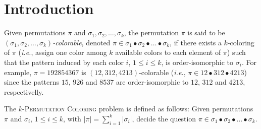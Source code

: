 \section{Introduction}
\label{section:Introduction}

Given permutations $\pi$ and $\sigma_1, \sigma_2, \ldots, \sigma_k$,
the permutation $\pi$ is said to be
\emph{$(\sigma_1, \sigma_2, \ldots, \sigma_k)$-colorable},
denoted $\pi \in \sigma_1 \bullet \sigma_2 \bullet \dots \bullet \sigma_k$,
if there exists a $k$-coloring of $\pi$ (\emph{i.e.}, assign one color
among $k$ available colors to each element of $\pi$) such that the
pattern induced by each color $i$, $1 \leq i \leq k$, is order-isomorphic
to $\sigma_i$.
For example, $\pi = 192854367$ is $(12, 312, 4213)$-colorable
(\emph{i.e.}, $\pi \in 12 \bullet 312 \bullet 4213$) since
the patterns $15$, $926$ and $8537$ are order-isomorphic to
$12$, $312$ and $4213$, respectivelly.

The \textsc{$k$-Permutation Coloring} problem is defined as follows:
Given permutations $\pi$ and $\sigma_i$, $1 \leq i \leq k$, with
$|\pi| = \sum_{i=1}^k |\sigma_i|$,
decide the question
$\pi \in \sigma_1 \bullet \sigma_2 \bullet \dots \bullet \sigma_k$.


